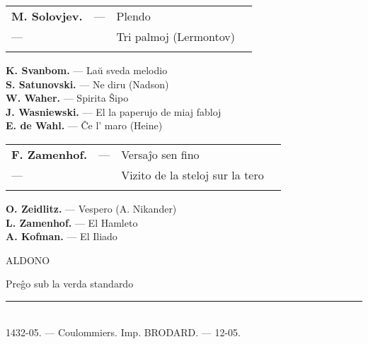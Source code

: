 {\newpage
\begin{longtabu} to
\bf M. Solovjev. & --- & Plendo \dotfill & \pageref{plendo}\\
\hfil--- & & Tri palmoj (Lermontov) \dotfill & \pageref{palmoj}\\
\vspace*{-40pt}
\end{longtabu}
{\bf K. Svanbom.}  ---  Laŭ sveda melodio \dotfill  \pageref{sveda}\\
{\bf S. Satunovski.}  ---  Ne diru (Nadson) \dotfill  \pageref{nediru}\\
{\bf W. Waher.}  ---  Spirita Ŝipo \dotfill  \pageref{spirita}\\
{\bf J. Wasniewski.}  --- El la paperujo de miaj fabloj \dotfill  \pageref{paperujo}\\
{\bf E. de Wahl.}  ---  Ĉe l' maro (Heine) \dotfill  \pageref{maro}\\
\vspace*{-21pt}
\begin{longtabu} to
\bf F. Zamenhof. & --- & Versaĵo sen fino \dotfill \pageref{senfino}\\
\hfil--- & & Vizito de la steloj sur la tero \dotfill \pageref{vizito}\\
\vspace*{-40pt}
\end{longtabu}
{\bf O. Zeidlitz.}  ---  Vespero (A. Nikander) \dotfill  \pageref{vespero}\\
{\bf L. Zamenhof.}  ---  El Hamleto \dotfill  \pageref{hamleto}\\
{\bf A. Kofman.} --- El Iliado \dotfill  \pageref{iliado}

{\centering \sansfont ALDONO\par}

Preĝo sub la verda standardo \dotfill \pageref{standardo}

} %

\vspace*{\fill}

\begin{center}
\rule{13mm}{0.4pt}\\
\footnotesize 1432-05. --- Coulommiers. Imp.  BRODARD. --- 12-05.
\end{center}
\cleardoublepage

